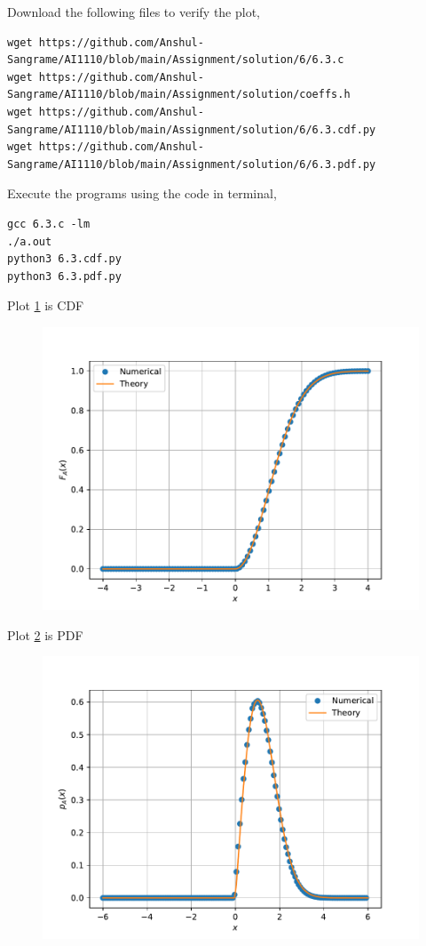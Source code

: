 \documentclass[journal,12pt,twocolumn]{IEEEtran}
\renewcommand\thesection{\arabic{section}}
\begin{document}
\begin{enumerate}[label=\thesection.\arabic*,ref=\thesection.\theenumi]
Download the following files to verify the plot,
\begin{lstlisting}
wget https://github.com/Anshul-Sangrame/AI1110/blob/main/Assignment/solution/6/6.3.c
wget https://github.com/Anshul-Sangrame/AI1110/blob/main/Assignment/solution/coeffs.h
wget https://github.com/Anshul-Sangrame/AI1110/blob/main/Assignment/solution/6/6.3.cdf.py
wget https://github.com/Anshul-Sangrame/AI1110/blob/main/Assignment/solution/6/6.3.pdf.py
\end{lstlisting}
Execute the programs using the code in terminal,
\begin{lstlisting}
gcc 6.3.c -lm
./a.out
python3 6.3.cdf.py
python3 6.3.pdf.py
\end{lstlisting}
Plot \ref{fig:6.3.cdf} is CDF
\begin{figure}[!ht]
    \centering
    \includegraphics[width=\columnwidth]{../figs/ral_cdf.pdf}
    \caption{}
    \label{fig:6.3.cdf}
\end{figure}

Plot \ref{fig:6.3.pdf} is PDF
\begin{figure}[!ht]
    \centering
    \includegraphics[width=\columnwidth]{../figs/ral_pdf.pdf}
    \caption{}
    \label{fig:6.3.pdf}
\end{figure}
%
\end{enumerate}
%
%
\end{document}
